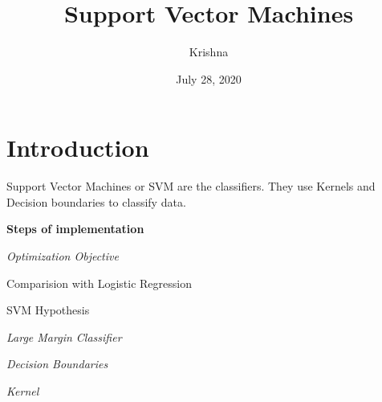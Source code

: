 \documentclass[a4paper,11pt]{article}
\begin{document}
\title{Support Vector Machines}
\author{Krishna}
\date{July 28, 2020}
\maketitle

\section{Introduction}
Support Vector Machines or SVM are the classifiers. 
They use Kernels and Decision boundaries to classify data.

\textbf{Steps of implementation}

\begin{compactenum}
\item\textit{Optimization Objective}
\begin{inparaenum}

    \item{Comparision with Logistic Regression}

    \item{SVM Hypothesis}

\end{inparaenum}

\item\textit{Large Margin Classifier}

\item \textit{Decision Boundaries}
\item \textit{Kernel}
\end{compactenum}
\end{document}
